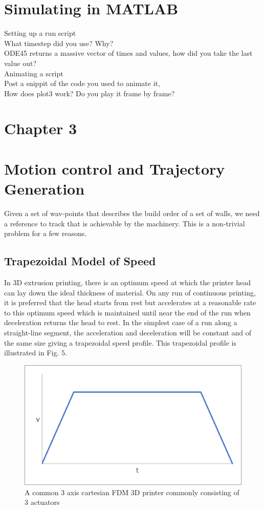 \documentclass{UoNMCHA}
\numberwithin{equation}{section}
\begin{document}
\section{Simulating in MATLAB}
Setting up a run script\\
What timestep did you use? Why? \\
ODE45 returns a massive vector of times and values, how did you take the last value out?\\


Animating a script\\
Post a snippit of the code you used to animate it, \\
How does plot3 work? Do you play it frame by frame?\\


\newpage
\section*{Chapter 3}
\section{Motion control and Trajectory Generation}

Given a set of wav-points that describes the build order of a set of walls, we need a reference to track
that is achievable by the machinery. This is a non-trivial problem for a few reasons.
\subsection{Trapezoidal Model of Speed}
In $3 \mathrm{D}$ extrusion printing, there is an optimum speed at which the printer head can lay down the ideal
thickness of material. On any run of continuous printing, it is preferred that the head starts from rest but
accelerates at a reasonable rate to this optimum speed which is maintained until near the end of the run
when deceleration returns the head to rest. In the simplest case of a run along a straight-line segment,
the acceleration and deceleration will be constant and of the same size giving a trapezoidal speed profile.
This trapezoidal profile is illustrated in Fig. $5 .$

\begin{figure}[H]
\begin{center}
\includegraphics[width=.5\linewidth]{figs/Picture9}
\caption{A  common 3 axis cartesian FDM 3D printer commonly consisting of 3 actuators}
\label{figs/Picture9}
\end{center}
\end{figure}
\end{document}
